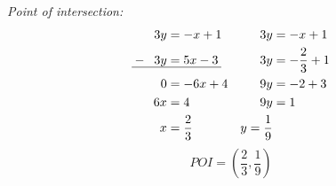\begin{enumerate}
	\textit{Point of intersection:}
	\begin{align*}
		3y&=-x+1 & 3y&=-x+1\\
		\makebox[0pt][l]{\uline{\phantom{$--3y=5x-3$}}}
		-\;\;3y&=5x-3 & 3y&=-\frac{2}{3}+1\\
		0&=-6x+4 & 9y&=-2+3\\
		6x&=4 & 9y&=1\\
		x&=\frac{2}{3} & y=\frac{1}{9}\\
	\end{align*}
	\begin{equation*}
		POI = \left(\frac{2}{3},\frac{1}{9}\right)
	\end{equation*}
\end{enumerate}